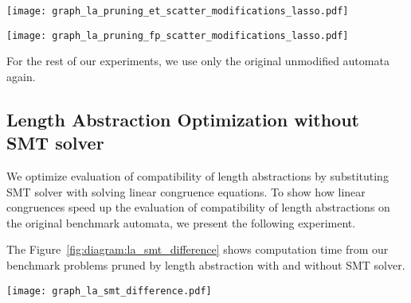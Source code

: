 \begin{figure*}[ht]
    \centering
    \begin{minipage}{0.49\linewidth}
        \centering
        \texttt{[image: graph\_la\_pruning\_et\_scatter\_modifications\_lasso.pdf]}
        \caption{Emptiness problem.}
        \label{fig:graph:et_state_space_sizes_comp_with_lasso}
    \end{minipage}
    \hfill
    \begin{minipage}{0.49\linewidth}
        \centering
        \texttt{[image: graph\_la\_pruning\_fp\_scatter\_modifications\_lasso.pdf]}
        \caption{Product construction.}
        \label{fig:graph:fp_state_space_sizes_comp_with_lasso}
    \end{minipage}
    \vspace{0.5cm}
    \caption{Comparison of state space sizes in basic product and product optimized by length abstraction with a sum of states generated for both lasso automata. Both axes are in symetrical logarithmic scale, x-axis showing the number of states in the unoptimized product, y-axis the number of states in the optimized product.}
    \label{fig:graph:product_state_space_sizes_with_lasso}
\end{figure*}

For the rest of our experiments, we use only the original unmodified automata again.

\subsection{Length Abstraction Optimization without SMT solver}

We optimize evaluation of compatibility of length abstractions by substituting SMT solver with solving linear congruence equations. To show how linear congruences speed up the evaluation of compatibility of length abstractions on the original benchmark automata, we present the following experiment.

The Figure~\ref{fig:diagram:la_smt_difference} shows computation time from our benchmark problems pruned by length abstraction with and without SMT solver.

\begin{figure*}[ht]
	\centering
	\texttt{[image: graph\_la\_smt\_difference.pdf]}
	\caption{Comparison of time consumption of length abstraction evaluated by SMT solver and length abstraction evaluated without SMT solver combining both benchmark problems. Both axis are in symmetrical logaritmic scale. They show time consumption in seconds: x-axis length abstraction evaluated by SMT solver, y-axis length abstraction evaluated without SMT solver.}
	\label{fig:diagram:la_smt_difference}
\end{figure*}

